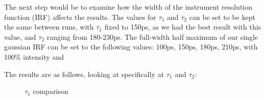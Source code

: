 The next step would be to examine how the width of the instrument resolution function (IRF) affects the results. The values for $\tau_1$ and $\tau_2$ can be set to be kept the same between runs, with $\tau_1$ fixed to 150ps, as we had the best result with this value, and $\tau_2$ ranging from 180-230ps. The full-width half maximum of our single gaussian IRF can be set to the following values: 100ps, 150ps, 180ps, 210ps, with 100\% intensity and 

The results are as follows, looking at specifically at $\tau_1$ and $\tau_2$:

\begin{figure}[H]
    \caption{$\tau_1$ comparison}
    \centering
\end{figure}
